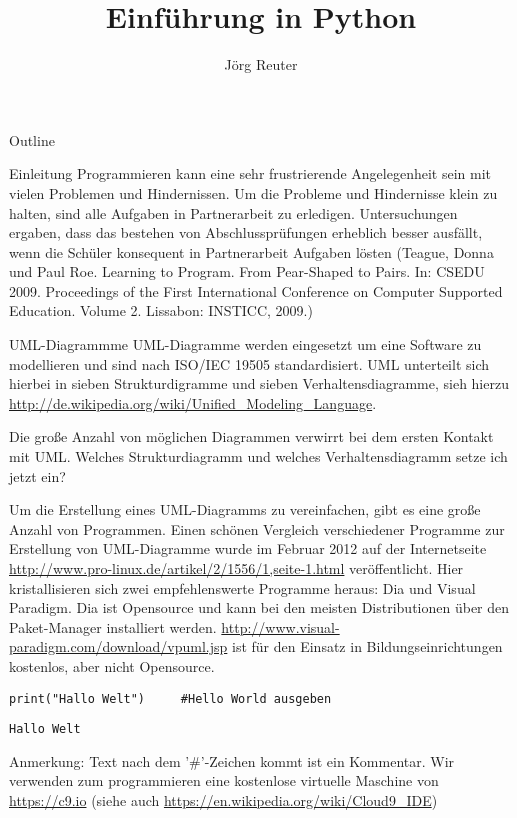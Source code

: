 \documentclass[presentation]{beamer}
\author{Jörg Reuter}
\date{}
\title{Einführung in Python}
\begin{document}
\maketitle
\begin{frame}{Outline}
\tableofcontents
\end{frame}


\begin{frame}[fragile,label={sec:orgheadline1}]{Einleitung}
 Programmieren kann eine sehr frustrierende Angelegenheit sein mit vielen Problemen und Hindernissen. Um die Probleme und Hindernisse klein zu halten, sind alle Aufgaben in Partnerarbeit zu erledigen. Untersuchungen ergaben, dass das bestehen von Abschlussprüfungen erheblich besser ausfällt, wenn die Schüler konsequent in Partnerarbeit Aufgaben lösten (Teague, Donna und Paul Roe. Learning to Program. From Pear-Shaped to  Pairs. In: CSEDU 2009. Proceedings of the First International Conference on Computer Supported Education. Volume 2. Lissabon: INSTICC, 2009.)

\begin{block}{UML-Diagrammme}
UML-Diagramme werden eingesetzt um eine Software zu modellieren und sind nach ISO/IEC 19505 standardisiert. UML unterteilt sich hierbei in sieben Strukturdigramme und sieben Verhaltensdiagramme, sieh hierzu \url{http://de.wikipedia.org/wiki/Unified_Modeling_Language}.

Die große Anzahl von möglichen Diagrammen verwirrt bei dem ersten Kontakt mit UML. Welches Strukturdiagramm und welches Verhaltensdiagramm setze ich jetzt ein?

Um die Erstellung eines UML-Diagramms zu vereinfachen, gibt es eine große Anzahl von Programmen. Einen schönen Vergleich verschiedener Programme zur Erstellung von UML-Diagramme wurde im Februar 2012 auf der Internetseite \url{http://www.pro-linux.de/artikel/2/1556/1,seite-1.html} veröffentlicht. Hier kristallisieren sich zwei empfehlenswerte Programme heraus: Dia und Visual Paradigm. Dia ist Opensource und kann bei den meisten Distributionen über den Paket-Manager installiert werden. \url{http://www.visual-paradigm.com/download/vpuml.jsp} ist für den Einsatz in Bildungseinrichtungen kostenlos, aber nicht Opensource.

\begin{verbatim}
print("Hallo Welt")     #Hello World ausgeben
\end{verbatim}

\begin{verbatim}
Hallo Welt
\end{verbatim}

Anmerkung:
Text nach dem '\#'-Zeichen kommt ist ein Kommentar.
Wir verwenden zum programmieren eine kostenlose virtuelle Maschine von \url{https://c9.io} (siehe auch \url{https://en.wikipedia.org/wiki/Cloud9_IDE})
\end{block}
\end{frame}
\end{document}

